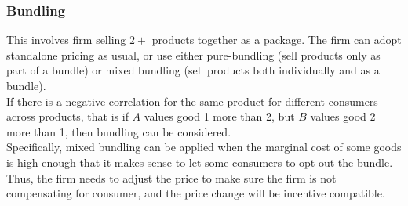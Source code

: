 \subsubsection{Bundling}
This involves firm selling $2+$ products together as a package. The firm can adopt standalone pricing as usual, or use either pure-bundling (sell products only as part of a bundle) or mixed bundling (sell products both individually and as a bundle). \\
If there is a negative correlation for the same product for different consumers across products, that is if $A$ values good 1 more than 2, but $B$ values good 2 more than 1, then bundling can be considered. \\
Specifically, mixed bundling can be applied when the marginal cost of some goods is high enough that it makes sense to let some consumers to opt out the bundle. Thus, the firm needs to adjust the price to make sure the firm is not compensating for consumer, and the price change will be incentive compatible.

\newpage